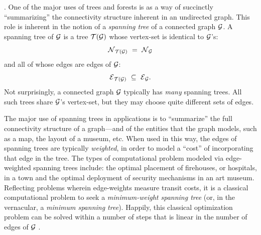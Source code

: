 .
One of the major uses of trees and forests is as a way of succinctly
``summarizing'' the connectivity structure inherent in an undirected
graph.  This role is inherent in the notion of a {\it spanning tree}
  
of a connected graph $\mbox{$\cal G$}$.  A spanning tree of $\mbox{$\cal G$}$ is a tree $\mbox{$\cal T$}(\mbox{$\cal G$})$
whose vertex-set is identical to $\mbox{$\cal G$}$'s:
\[ \mbox{$\cal N$}_{\mbox{{\scriptsize $\cal T$}}(\mbox{{\scriptsize $\cal G$}})} \ = \ \mbox{$\cal N$}_{\mbox{{\scriptsize $\cal G$}}} \]
and all of whose edges are edges of $\mbox{$\cal G$}$:
\[ \mbox{$\cal E$}_{\mbox{{\scriptsize $\cal T$}}(\mbox{{\scriptsize $\cal G$}})} \ \subseteq \ \mbox{$\cal E$}_{\mbox{{\scriptsize $\cal G$}}}. \]
Not surprisingly, a connected graph $\mbox{$\cal G$}$  typically has {\em many}
spanning trees.  All such trees share $\mbox{$\cal G$}$'s vertex-set, but they may
choose quite different sets of edges.


The major use of spanning trees in applications is to ``summarize''
the full connectivity structure of a graph---and of the entities that
the graph models, such as a map, the layout of a museum, etc.  When
used in this way, the edges of spanning trees are typically {\em
  weighted},  in order to
model a ``cost'' of incorporating that edge in the tree.  The types of
computational problem modeled via edge-weighted spanning trees
include: the optimal placement of firehouses, or hospitals, in a town
and the optimal deployment of security mechanisms in an art museum.
Reflecting problems wherein edge-weights measure transit costs, it is
a classical computational problem to seek a {\em minimum-weight
  spanning tree} 
 (or, in the vernacular, a {\em
  minimum spanning tree}).  Happily, this classical optimization
problem can be solved within a number of steps that is linear in the
number of edges of $\mbox{$\cal G$}$ \cite{CLRS}.


